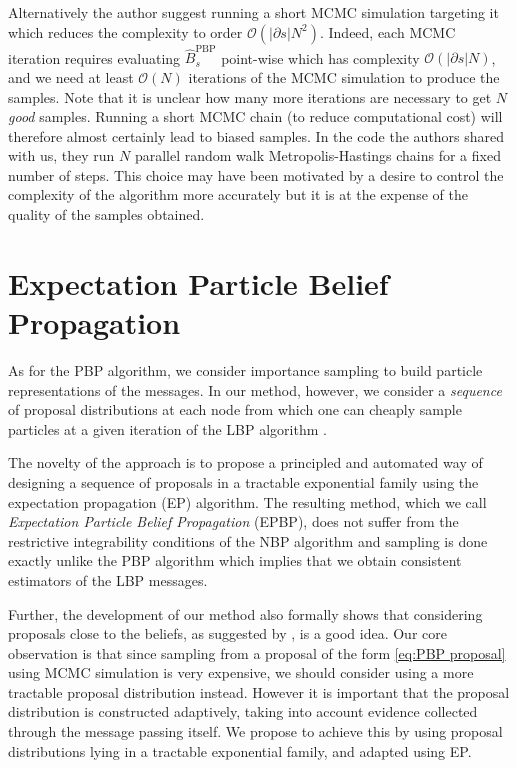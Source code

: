 Alternatively the author suggest running a short MCMC simulation targeting it which reduces the complexity to order $\mathcal O {(|\partial {s}|N^{2})}$. Indeed, each MCMC iteration requires evaluating $\widehat B_{s}^{\text{PBP}}$ point-wise which has complexity $\mathcal O {(|\partial{s}|N)}$, and we need at least $\mathcal{O}(N)$ iterations of the MCMC simulation to produce the samples. Note that it is unclear how many more iterations are necessary to get $N$ \emph{good} samples. Running a short MCMC chain (to reduce computational cost) will therefore almost certainly lead to biased samples. In the code the authors shared with us, they run $N$ parallel random walk Metropolis-Hastings chains \citep[chapter 6]{robert04} for a fixed number of steps. This choice may have been motivated by a desire to control the complexity of the algorithm more accurately but it is at the expense of the quality of the samples obtained.

\section{Expectation Particle Belief Propagation}
As for the PBP algorithm, we consider importance sampling to build particle representations of the messages. In our method, however, we consider a \emph{sequence} of proposal distributions at each node from which one can cheaply sample particles at a given iteration of the LBP algorithm \citep{lienart15}.

The novelty of the approach is to propose a principled and automated way of designing a sequence of proposals in a tractable exponential family using the expectation propagation (EP) algorithm. The resulting method, which we call \emph{Expectation Particle Belief Propagation} (EPBP), does not suffer from the restrictive integrability conditions of the NBP algorithm and sampling is done exactly unlike the PBP algorithm which implies that we obtain consistent estimators of the LBP messages.

Further, the development of our method also formally shows that considering proposals close to the beliefs, as suggested by \cite{ihler09}, is a good idea.  Our core observation is that since sampling from a proposal of the form \eqref{eq:PBP proposal} using MCMC simulation is very expensive, we should consider using a more tractable proposal distribution instead. However it is important that the proposal distribution is constructed adaptively, taking into account evidence collected through the message passing itself. We propose to achieve this by using proposal distributions lying in a tractable exponential family, and adapted using EP.

